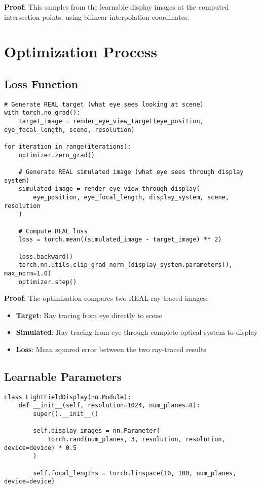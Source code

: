 \documentclass[11pt]{article}
\begin{document}
\textbf{Proof}: This samples from the learnable display images at the computed intersection points, using bilinear interpolation coordinates.

\section{Optimization Process}

\subsection{Loss Function}

\begin{lstlisting}[caption={Real optimization loss}]
# Generate REAL target (what eye sees looking at scene)
with torch.no_grad():
    target_image = render_eye_view_target(eye_position, eye_focal_length, scene, resolution)

for iteration in range(iterations):
    optimizer.zero_grad()
    
    # Generate REAL simulated image (what eye sees through display system)
    simulated_image = render_eye_view_through_display(
        eye_position, eye_focal_length, display_system, scene, resolution
    )
    
    # Compute REAL loss
    loss = torch.mean((simulated_image - target_image) ** 2)
    
    loss.backward()
    torch.nn.utils.clip_grad_norm_(display_system.parameters(), max_norm=1.0)
    optimizer.step()
\end{lstlisting}

\textbf{Proof}: The optimization compares two REAL ray-traced images:
\begin{itemize}
    \item \textbf{Target}: Ray tracing from eye directly to scene
    \item \textbf{Simulated}: Ray tracing from eye through complete optical system to display
    \item \textbf{Loss}: Mean squared error between the two ray-traced results
\end{itemize}

\subsection{Learnable Parameters}

\begin{lstlisting}[caption={Optimizable display system}]
class LightFieldDisplay(nn.Module):
    def __init__(self, resolution=1024, num_planes=8):
        super().__init__()
        
        self.display_images = nn.Parameter(
            torch.rand(num_planes, 3, resolution, resolution, device=device) * 0.5
        )
        
        self.focal_lengths = torch.linspace(10, 100, num_planes, device=device)
\end{lstlisting}
\end{document}

